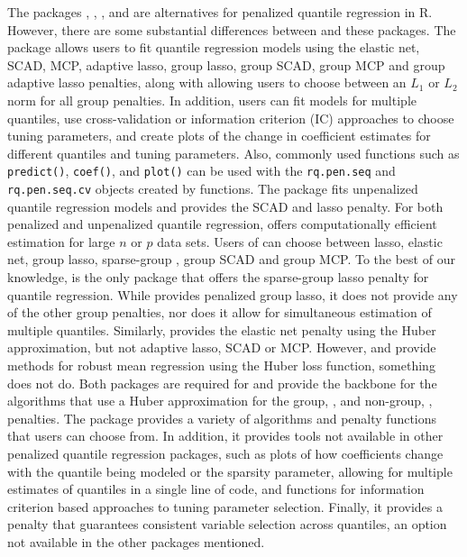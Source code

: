 The packages , , , and  are alternatives for penalized quantile regression in R. However, there are some substantial differences between  and these packages. The package  allows users to fit quantile regression models using the elastic net, SCAD, MCP, adaptive lasso, group lasso, group SCAD, group MCP and group adaptive lasso penalties, along with allowing users to choose between an \(L_1\) or \(L_2\) norm for all group penalties. In addition, users can fit models for multiple quantiles, use cross-validation or information criterion (IC) approaches to choose tuning parameters, and create plots of the change in coefficient estimates for different quantiles and tuning parameters. Also, commonly used functions such as \texttt{predict()}, \texttt{coef()}, and \texttt{plot()} can be used with the \texttt{rq.pen.seq} and \texttt{rq.pen.seq.cv} objects created by  functions. The package  fits unpenalized quantile regression models and provides the SCAD and lasso penalty. For both penalized and unpenalized quantile regression,  offers computationally efficient estimation for large \(n\) or \(p\) data sets. Users of  can choose between lasso, elastic net, group lasso, sparse-group \citep{sparseGroup}, group SCAD and group MCP. To the best of our knowledge,  is the only package that offers the sparse-group lasso penalty for quantile regression. While  provides penalized group lasso, it does not provide any of the other group penalties, nor does it allow for simultaneous estimation of multiple quantiles. Similarly,  provides the elastic net penalty using the Huber approximation, but not adaptive lasso, SCAD or MCP. However,  and  provide methods for robust mean regression using the Huber loss function, something  does not do. Both packages are required for  and provide the backbone for the algorithms that use a Huber approximation for the group, , and non-group, , penalties. The package  provides a variety of algorithms and penalty functions that users can choose from. In addition, it provides tools not available in other penalized quantile regression packages, such as plots of how coefficients change with the quantile being modeled or the sparsity parameter, allowing for multiple estimates of quantiles in a single line of code, and functions for information criterion based approaches to tuning parameter selection. Finally, it provides a penalty that guarantees consistent variable selection across quantiles, an option not available in the other packages mentioned.

